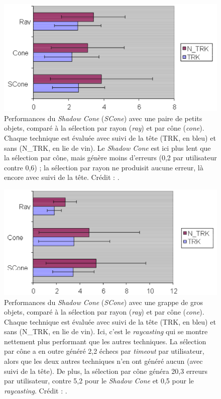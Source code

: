 	\begin{figure}[H]
		\centering
		\includegraphics[width=\textwidth]{figures/ch2/shadowPSmall}
		\caption[Performances du \emph{Shadow Cone} --- Paire de petits objets]{Performances du \emph{Shadow Cone} (\emph{SCone}) avec une paire de petits objets, comparé à la sélection par rayon (\emph{ray}) et par cône (\emph{cone}). Chaque technique est évaluée avec suivi de la tête (TRK, en bleu) et sans (N\_{}TRK, en lie de vin). Le \emph{Shadow Cone} est ici plus lent que la sélection par cône, mais génère moins d'erreurs (0,2 par utilisateur contre 0,6) ; la sélection par rayon ne produisit aucune erreur, là encore avec suivi de la tête. Crédit : \cite{steed20043d}.}
		\label{fig:shadowPSmall}
	\end{figure}
	
	\begin{figure}[H]
		\centering
		\includegraphics[width=\textwidth]{figures/ch2/shadowCLarge}
		\caption[Performances du \emph{Shadow Cone} --- Grappe de gros objets]{Performances du \emph{Shadow Cone} (\emph{SCone}) avec une grappe de gros objets, comparé à la sélection par rayon (\emph{ray}) et par cône (\emph{cone}). Chaque technique est évaluée avec suivi de la tête (TRK, en bleu) et sans (N\_{}TRK, en lie de vin). Ici, c'est le \emph{raycasting} qui se montre nettement plus performant que les autres techniques. La sélection par cône a en outre généré 2,2 échecs par \emph{timeout} par utilisateur, alors que les deux autres techniques n'en ont généré aucun (avec suivi de la tête). De plus, la sélection par cône généra 20,3 erreurs par utilisateur, contre 5,2 pour le \emph{Shadow Cone} et 0,5 pour le \emph{raycasting}. Crédit : \cite{steed20043d}.}
		\label{fig:shadowCLarge}
	\end{figure}
	
